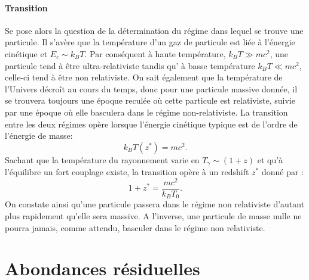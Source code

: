 \paragraph{Transition}
Se pose alors la question de la détermination du régime dans lequel se trouve une particule. Il s'avère que la température d'un gaz de particule est liée à l'énergie cinétique et $E_c\sim k_B T$. Par conséquent à haute température, $k_B T\gg mc^2$, une particule tend à être ultra-relativiste tandis qu' à basse température $k_B T\ll mc^2$, celle-ci tend à être non relativiste. On sait également que la température de l'Univers décroît au cours du temps, donc pour une particule massive donnée, il se trouvera toujours une époque reculée où cette particule est relativiste, suivie par une époque où elle basculera dans le régime non-relativiste. La transition entre les deux régimes opère lorsque l'énergie cinétique typique est de l'ordre de l'énergie de masse:
\begin{equation}
k_B T(z^*)=mc^2.
\end{equation}
Sachant que la température du rayonnement varie en $T_\gamma\sim (1+z)$ et qu'à l'équilibre un fort couplage existe, la transition opère à un redshift $z^*$ donné par :
\begin{equation}
1+z^*=\frac{mc^2}{k_B T_0}.
\end{equation}
 On constate ainsi qu'une particule passera dans le régime non relativiste d'autant plus rapidement qu'elle sera massive. A l'inverse, une particule de masse nulle ne pourra jamais, comme attendu, basculer dans le régime non relativiste.
 

 
 \section{Abondances résiduelles}
 

